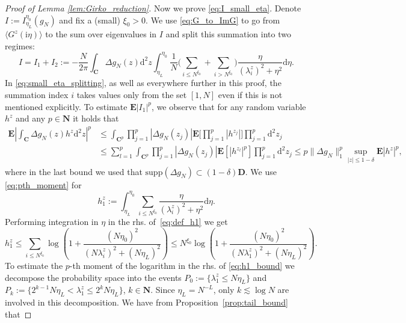\documentclass[10pt]{amsart}
\numberwithin{equation}{section}
\newcommand{\dif}{\mathrm{d}}
\newcommand{\E}{\mathbf{E}}
\newcommand{\C}{\mathbf{C}}
\newcommand{\N}{\mathbf{N}}
\newcommand{\ii}{\mathrm{i}}
\begin{document}
\begin{proof}[Proof of Lemma \ref{lem:Girko_reduction}]
Now we prove \eqref{eq:I_small_eta}. Denote $I:=I_{\eta_L}^{\eta_0}(g_N)$ and fix a (small) $\xi_0>0$. We use \eqref{eq:G_to_ImG} to go from $\langle G^z(\ii\eta)\rangle$ to the sum over eigenvalues in $I$ and split this summation into two regimes:
\begin{equation}
I= I_1+I_2 := - \frac{N}{2\pi}\int_\C \Delta g_N(z) \dif^2 z \int_{\eta_L}^{\eta_0} \frac{1}{N} \bigg(\sum_{i\le N^{\xi_0}}+\sum_{i> N^{\xi_0}}\bigg) \frac{\eta}{(\lambda_i^z)^2+\eta^2} \dif \eta.
\label{eq:small_eta_splitting}
\end{equation}
In \eqref{eq:small_eta_splitting}, as well as everywhere further in this proof, the summation index $i$ takes values only from the set $[1,N]$ even if this is not mentioned explicitly. To estimate $\E |I_1|^p$, we observe that for any random variable $h^z$ and any $p\in\N$ it holds that
\begin{equation}
\begin{split}
\E \left\vert \int_\C \Delta g_N(z)h^z\dif^2 z\right\vert^p &\le \int_{\C^p} \prod_{j=1}^p |\Delta g_N(z_j)|\E\Bigg[\prod_{j=1}^p |h^{z_j}|\Bigg]\prod_{j=1}^p \dif^2 z_j\\
&\le \sum_{l=1}^p \int_{\C^p} \prod_{j=1}^p |\Delta g_N(z_j)|\E\left[ |h^{z_l}|^p\right]\prod_{j=1}^p \dif^2 z_j \le p \|\Delta g_N\|_1^p \sup_{|z|\le 1-\delta} \E |h^z|^p, 
\end{split}
\label{eq:pth_moment}
\end{equation}
where in the last bound we used that $\mathrm{supp}(\Delta g_N) \subset (1-\delta)\mathbf{D}$. We use \eqref{eq:pth_moment} for
\begin{equation}
h^z_1:= \int_{\eta_L}^{\eta_0} \sum_{i\le N^{\xi_0}}\frac{\eta}{(\lambda_i^z)^2+\eta^2} \dif \eta.
\label{eq:def_h1}
\end{equation}
Performing integration in $\eta$ in the rhs. of~\eqref{eq:def_h1} we get
\begin{equation}
h^z_1 \le \sum_{i\le N^{\xi_0}} \log \left(1+\frac{(N\eta_0)^2}{(N\lambda_i^z)^2+(N\eta_L)^2}\right)\le N^{\xi_0} \log \left(1+\frac{(N\eta_0)^2}{(N\lambda_1^z)^2+(N\eta_L)^2}\right).
\label{eq:h1_bound}
\end{equation}
To estimate the $p$-th moment of the logarithm in the rhs. of \eqref{eq:h1_bound} we decompose the probability space into the events $P_0:=\{\lambda_1^z\le N\eta_L\}$ and $P_k:=\{2^{k-1} N\eta_L<\lambda_1^z\le 2^kN\eta_L\}$, $k\in \N$. Since $\eta_L=N^{-L}$, only $k\lesssim \log N$ are involved in this decomposition. We have from Proposition~\ref{prop:tail_bound} that  

\end{proof}
\end{document}
